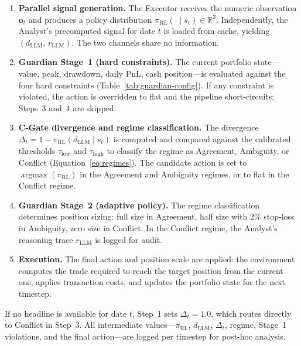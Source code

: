 \begin{enumerate}
  \item \textbf{Parallel signal generation.}
    The Executor receives the numeric observation $\mathbf{o}_t$ and
    produces a policy distribution
    $\pi_{\mathrm{RL}}(\cdot \mid s_t) \in \mathbb{R}^3$. Independently,
    the Analyst's precomputed signal for date $t$ is loaded from cache,
    yielding $(d_{\mathrm{LLM}},\, r_{\mathrm{LLM}})$. The two channels
    share no information.

  \item \textbf{Guardian Stage~1 (hard constraints).}
    The current portfolio state---value, peak, drawdown, daily PnL, cash
    position---is evaluated against the four hard constraints
    (Table~\ref{tab:guardian-config}). If any constraint is violated, the
    action is overridden to flat and the pipeline short-circuits; Steps~3
    and~4 are skipped.

  \item \textbf{C-Gate divergence and regime classification.}
    The divergence
    $\Delta_t = 1 - \pi_{\mathrm{RL}}(d_{\mathrm{LLM}} \mid s_t)$
    is computed and compared against the calibrated thresholds
    $\tau_{\mathrm{low}}$ and $\tau_{\mathrm{high}}$ to classify the
    regime as Agreement, Ambiguity, or Conflict
    (Equation~\ref{eq:regimes}). The candidate action is set to
    $\operatorname{argmax}(\pi_{\mathrm{RL}})$ in the Agreement and
    Ambiguity regimes, or to flat in the Conflict regime.

  \item \textbf{Guardian Stage~2 (adaptive policy).}
    The regime classification determines position sizing: full size in
    Agreement, half size with 2\% stop-loss in Ambiguity, zero size in
    Conflict. In the Conflict regime, the Analyst's reasoning trace
    $r_{\mathrm{LLM}}$ is logged for audit.

  \item \textbf{Execution.}
    The final action and position scale are applied: the environment
    computes the trade required to reach the target position from the
    current one, applies transaction costs, and updates the portfolio
    state for the next timestep.
\end{enumerate}

If no headline is available for date $t$, Step~1 sets
$\Delta_t = 1.0$, which routes directly to Conflict in Step~3.
All intermediate values---$\pi_{\mathrm{RL}}$, $d_{\mathrm{LLM}}$,
$\Delta_t$, regime, Stage~1 violations, and the final action---are logged
per timestep for post-hoc analysis.

